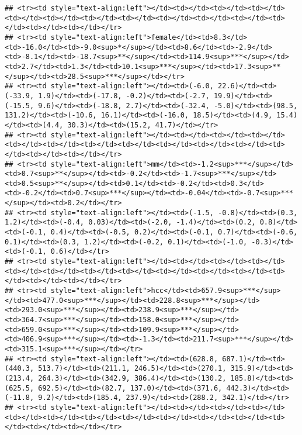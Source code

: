\documentclass[]{article}
\begin{document}
\begin{verbatim}
## <tr><td style="text-align:left"></td><td></td><td></td><td></td><td></td><td></td><td></td><td></td><td></td><td></td><td></td><td></td><td></td><td></td></tr>
## <tr><td style="text-align:left">female</td><td>8.3</td><td>-16.0</td><td>-9.0<sup>*</sup></td><td>8.6</td><td>-2.9</td><td>-8.1</td><td>-18.7<sup>**</sup></td><td>114.9<sup>***</sup></td><td>2.7</td><td>1.3</td><td>10.1<sup>***</sup></td><td>17.3<sup>**</sup></td><td>28.5<sup>***</sup></td></tr>
## <tr><td style="text-align:left"></td><td>(-6.0, 22.6)</td><td>(-33.9, 1.9)</td><td>(-17.8, -0.2)</td><td>(-2.7, 19.9)</td><td>(-15.5, 9.6)</td><td>(-18.8, 2.7)</td><td>(-32.4, -5.0)</td><td>(98.5, 131.2)</td><td>(-10.6, 16.1)</td><td>(-16.0, 18.5)</td><td>(4.9, 15.4)</td><td>(4.4, 30.3)</td><td>(15.2, 41.7)</td></tr>
## <tr><td style="text-align:left"></td><td></td><td></td><td></td><td></td><td></td><td></td><td></td><td></td><td></td><td></td><td></td><td></td><td></td></tr>
## <tr><td style="text-align:left">mm</td><td>-1.2<sup>***</sup></td><td>0.7<sup>**</sup></td><td>-0.2</td><td>-1.7<sup>***</sup></td><td>0.5<sup>**</sup></td><td>0.1</td><td>-0.2</td><td>0.3</td><td>-0.2</td><td>0.7<sup>***</sup></td><td>-0.04</td><td>-0.7<sup>***</sup></td><td>0.2</td></tr>
## <tr><td style="text-align:left"></td><td>(-1.5, -0.8)</td><td>(0.3, 1.2)</td><td>(-0.4, 0.03)</td><td>(-2.0, -1.4)</td><td>(0.2, 0.8)</td><td>(-0.1, 0.4)</td><td>(-0.5, 0.2)</td><td>(-0.1, 0.7)</td><td>(-0.6, 0.1)</td><td>(0.3, 1.2)</td><td>(-0.2, 0.1)</td><td>(-1.0, -0.3)</td><td>(-0.1, 0.6)</td></tr>
## <tr><td style="text-align:left"></td><td></td><td></td><td></td><td></td><td></td><td></td><td></td><td></td><td></td><td></td><td></td><td></td><td></td></tr>
## <tr><td style="text-align:left">hcc</td><td>657.9<sup>***</sup></td><td>477.0<sup>***</sup></td><td>228.8<sup>***</sup></td><td>293.0<sup>***</sup></td><td>238.9<sup>***</sup></td><td>364.7<sup>***</sup></td><td>158.0<sup>***</sup></td><td>659.0<sup>***</sup></td><td>109.9<sup>***</sup></td><td>406.9<sup>***</sup></td><td>-1.3</td><td>211.7<sup>***</sup></td><td>315.1<sup>***</sup></td></tr>
## <tr><td style="text-align:left"></td><td>(628.8, 687.1)</td><td>(440.3, 513.7)</td><td>(211.1, 246.5)</td><td>(270.1, 315.9)</td><td>(213.4, 264.3)</td><td>(342.9, 386.4)</td><td>(130.2, 185.8)</td><td>(625.5, 692.5)</td><td>(82.7, 137.0)</td><td>(371.6, 442.3)</td><td>(-11.8, 9.2)</td><td>(185.4, 237.9)</td><td>(288.2, 342.1)</td></tr>
## <tr><td style="text-align:left"></td><td></td><td></td><td></td><td></td><td></td><td></td><td></td><td></td><td></td><td></td><td></td><td></td><td></td></tr>

\end{verbatim}
\end{document}
